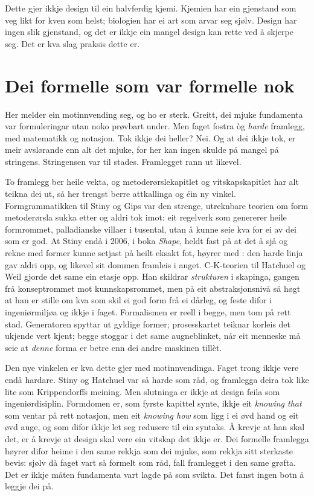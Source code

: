 Dette gjer ikkje design til ein halvferdig kjemi. Kjemien har ein gjenstand som veg likt for kven som helst; biologien har ei art som arvar seg sjølv. Design har ingen slik gjenstand, og det er ikkje ein mangel design kan rette ved å skjerpe seg. Det er kva slag praksis dette er.

\section{Dei formelle som var formelle nok}

Her melder ein motinnvending seg, og ho er sterk. Greitt, dei mjuke fundamenta var formuleringar utan noko prøvbart under. Men faget fostra òg \emph{harde} framlegg, med matematikk og notasjon. Tok ikkje dei heller? Nei. Og at dei ikkje tok, er meir avslørande enn alt det mjuke, for her kan ingen skulde på mangel på stringens. Stringensen var til stades. Framlegget rann ut likevel.

To framlegg ber heile vekta, og metoderørslekapitlet og vitskapskapitlet har alt teikna dei ut, så her trengst berre attkallinga og éin ny vinkel. Formgrammatikken til Stiny og Gips \autocite{stiny1972} var den strenge, utreknbare teorien om form metoderørsla sukka etter og aldri tok imot: eit regelverk som genererer heile formrommet, palladianske villaer i tusental, utan å kunne seie kva for ei av dei som er god. At Stiny endå i 2006, i boka \textit{Shape}, heldt fast på at det å sjå og rekne med former kunne setjast på heilt eksakt fot, høyrer med \autocite{stiny2006shape}: den harde linja gav aldri opp, og likevel sit dommen framleis i auget. C-K-teorien til Hatchuel og Weil \autocite{hatchuel2009} gjorde det same ein etasje opp. Han skildrar \emph{strukturen} i skapinga, gangen frå konseptrommet mot kunnskapsrommet, men på eit abstraksjonsnivå så høgt at han er stille om kva som skil ei god form frå ei dårleg, og feste difor i ingeniørmiljøa og ikkje i faget. Formalismen er reell i begge, men tom på rett stad. Generatoren spyttar ut gyldige former; prosesskartet teiknar korleis det ukjende vert kjent; begge stoggar i det same augneblinket, når eit menneske må seie at \emph{denne} forma er betre enn dei andre maskinen tillèt.

Den nye vinkelen er kva dette gjer med motinnvendinga. Faget trong ikkje vere endå hardare. Stiny og Hatchuel var så harde som råd, og framlegga deira tok like lite som Krippendorffs meining. Men slutninga er ikkje at design feila som ingeniørdisiplin. Formdomen er, som fyrste kapittel synte, ikkje eit \emph{knowing that} som ventar på rett notasjon, men eit \emph{knowing how} som ligg i ei øvd hand og eit øvd auge, og som difor ikkje let seg redusere til ein syntaks. Å krevje at han skal det, er å krevje at design skal vere ein vitskap det ikkje er. Dei formelle framlegga høyrer difor heime i den same rekkja som dei mjuke, som rekkja sitt sterkaste bevis: sjølv då faget vart så formelt som råd, fall framlegget i den same grøfta. Det er ikkje måten fundamenta vart lagde på som svikta. Det fanst ingen botn å leggje dei på.

